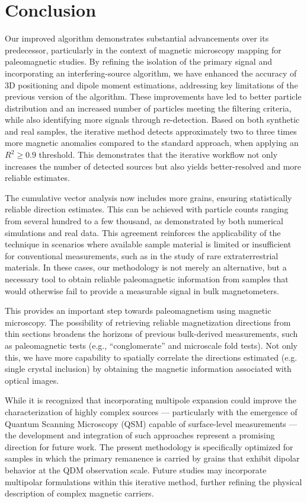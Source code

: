 \section{Conclusion}

Our improved algorithm demonstrates substantial advancements over its predecessor, particularly in the context of magnetic microscopy mapping for paleomagnetic studies. By refining the isolation of the primary signal and incorporating an interfering-source algorithm, we have enhanced the accuracy of 3D positioning and dipole moment estimations, addressing key limitations of the previous version of the algorithm. These improvements have led to better particle distribution and an increased number of particles meeting the filtering criteria, while also identifying more signals through re-detection. Based on both synthetic and real samples, the iterative method detects approximately two to three times more magnetic anomalies compared to the standard approach, when applying an \(R^{2} \geq 0.9\) threshold. This demonstrates that the iterative workflow not only increases the number of detected sources but also yields better-resolved and more reliable estimates.

The cumulative vector analysis now includes more grains, ensuring statistically reliable direction estimates. This can be achieved with particle counts ranging from several hundred to a few thousand, as demonstrated by both numerical simulations and real data. This agreement reinforces the applicability of the technique in scenarios where available sample material is limited or insufficient for conventional measurements, such as in the study of rare extraterrestrial materials. In these cases, our methodology is not merely an alternative, but a necessary tool to obtain reliable paleomagnetic information from samples that would otherwise fail to provide a measurable signal in bulk magnetometers.

This provides an important step towards paleomagnetism using magnetic microscopy. The possibility of retrieving reliable magnetization directions from thin sections broadens the horizons of previous bulk-derived measurements, such as paleomagnetic tests (e.g., ``conglomerate'' and microscale fold tests). Not only this, we have more capability to spatially correlate the directions estimated (e.g. single crystal inclusion) by obtaining the magnetic information associated with optical images.

While it is recognized that incorporating multipole expansion could improve the characterization of highly complex sources --- particularly with the emergence of Quantum Scanning Microscopy (QSM) capable of surface-level measurements --- the development and integration of such approaches represent a promising direction for future work. The present methodology is specifically optimized for samples in which the primary remanence is carried by grains that exhibit dipolar behavior at the QDM observation scale. Future studies may incorporate multipolar formulations within this iterative method, further refining the physical description of complex magnetic carriers.


